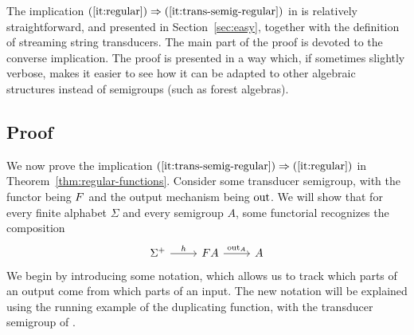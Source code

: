 The implication $(\ref{it:regular}) \Rightarrow (\ref{it:trans-semig-regular})$ in  is relatively straightforward, and presented in Section~\ref{sec:easy}, together with the definition of streaming string transducers. The main part of the proof  is devoted to the converse implication. The proof is presented in a way which, if sometimes slightly verbose, makes it easier to see how it can be adapted to other algebraic structures instead of semigroups (such as forest algebras).





\subsection{Proof}

We now prove the implication $(\ref{it:trans-semig-regular}) \Rightarrow (\ref{it:regular})$ in Theorem~\ref{thm:regular-functions}. Consider some transducer semigroup, with the functor being $\functor$ and the output mechanism being $\mathrm{out}$. We will show that for every finite alphabet $\Sigma$ and every semigroup $A$, some functorial \sst recognizes the composition
\[
    \begin{tikzcd}
    \Sigma^+ 
    \ar[r,"h"]
    &
    \functor A
    \ar[r,"\outfun_A"]
    &
    A
    \end{tikzcd}
    \]
We begin by introducing some notation, which allows us to track which parts of an output come from which parts of an input. The new notation will be explained using the running example of the duplicating function, with the transducer semigroup of .


